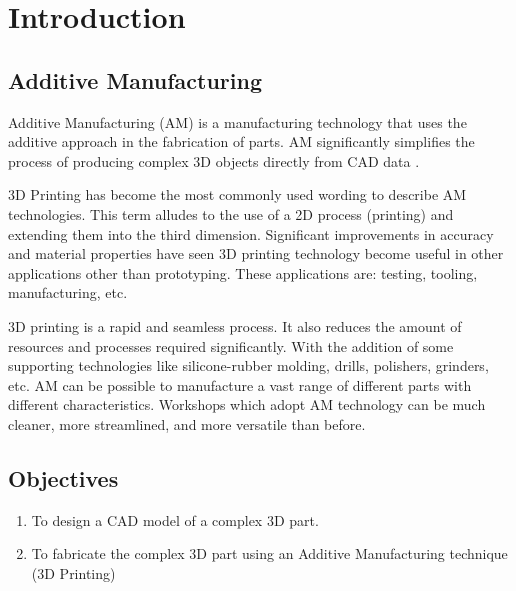 \chapter{Introduction}
\lhead{\leftmark}
\label{sec:introduction}
\section{Additive Manufacturing}
Additive Manufacturing (AM) is a manufacturing technology that uses the additive approach in the fabrication of parts. AM significantly
simplifies the process of producing complex 3D objects directly from CAD data .

3D Printing has become the most commonly used wording to describe AM technologies. This term alludes to the use of a 2D process (printing) and extending them into the third dimension. Significant improvements in accuracy and material properties have seen 3D printing
technology become useful in other applications other than prototyping. These applications are: testing, tooling, manufacturing, etc. 

3D printing is a rapid and seamless process. It also reduces the amount of resources and processes required significantly. With the addition of some supporting technologies like silicone-rubber
molding, drills, polishers, grinders, etc. AM can be possible to manufacture a vast
range of different parts with different characteristics. Workshops which adopt AM
technology can be much cleaner, more streamlined, and more versatile than before.

\section{Objectives}
\begin{enumerate}
\item To design a CAD model of a complex 3D part.
\item To fabricate the complex 3D part using an Additive Manufacturing technique (3D Printing)
\end{enumerate}
